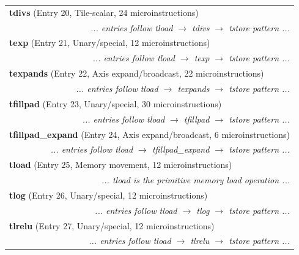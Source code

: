 \begin{longtable}{r r r r r r r r}
\multicolumn{8}{l}{\textbf{tdivs} (Entry 20, Tile-scalar, 24 microinstructions)} \\
  & \multicolumn{7}{r}{\textit{... entries follow tload $\rightarrow$ tdivs $\rightarrow$ tstore pattern ...}} \\

\multicolumn{8}{l}{\textbf{texp} (Entry 21, Unary/special, 12 microinstructions)} \\
  & \multicolumn{7}{r}{\textit{... entries follow tload $\rightarrow$ texp $\rightarrow$ tstore pattern ...}} \\

\multicolumn{8}{l}{\textbf{texpands} (Entry 22, Axis expand/broadcast, 22 microinstructions)} \\
  & \multicolumn{7}{r}{\textit{... entries follow tload $\rightarrow$ texpands $\rightarrow$ tstore pattern ...}} \\

\multicolumn{8}{l}{\textbf{tfillpad} (Entry 23, Unary/special, 30 microinstructions)} \\
  & \multicolumn{7}{r}{\textit{... entries follow tload $\rightarrow$ tfillpad $\rightarrow$ tstore pattern ...}} \\

\multicolumn{8}{l}{\textbf{tfillpad\_expand} (Entry 24, Axis expand/broadcast, 6 microinstructions)} \\
  & \multicolumn{7}{r}{\textit{... entries follow tload $\rightarrow$ tfillpad\_expand $\rightarrow$ tstore pattern ...}} \\

\multicolumn{8}{l}{\textbf{tload} (Entry 25, Memory movement, 12 microinstructions)} \\
  & \multicolumn{7}{r}{\textit{... tload is the primitive memory load operation ...}} \\

\multicolumn{8}{l}{\textbf{tlog} (Entry 26, Unary/special, 12 microinstructions)} \\
  & \multicolumn{7}{r}{\textit{... entries follow tload $\rightarrow$ tlog $\rightarrow$ tstore pattern ...}} \\

\multicolumn{8}{l}{\textbf{tlrelu} (Entry 27, Unary/special, 12 microinstructions)} \\
  & \multicolumn{7}{r}{\textit{... entries follow tload $\rightarrow$ tlrelu $\rightarrow$ tstore pattern ...}} \\


\end{longtable}

